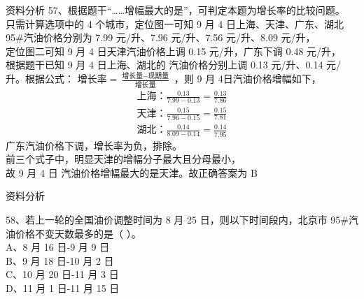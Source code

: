 \documentclass[aspectratio=169]{beamer}
\begin{document}
\begin{frame}[t]{资料分析}
    57、根据题干“……增幅最大的是”，可判定本题为增长率的比较问题。\\
    只需计算选项中的 4 个城市，定位图一可知 9 月 4 日上海、天津、广东、湖北 95\#汽油价格分别为 7.99 元/升、7.96 元/升、7.56 元/升、8.09
    元/升，\\
    定位图二可知 9 月 4 日天津汽油价格上调 0.15 元/升，广东下调 0.48 元/升，\\
    根据题干已知 9 月 4 日上海、湖北的 汽油价格分别上调 0.13 元/升、0.14 元/升。根据公式：
    $\text{增长率} = \frac{\text{增长量} - \text{现期量}}{\text{增长量}}$
    ，则 9 月 4日汽油价格增幅如下，
    \begin{gather}
        \text{上海：} \frac{0.13}{7.99-0.13} = \frac{0.13}{7.86}\\
        \text{天津：}\frac{0.15}{7.96-0.15} = \frac{0.15}{7.81}\\
        \text{湖北：}\frac{0.14}{8.09-0.14} = \frac{0.14}{7.95}
    \end{gather}
    广东汽油价格下调，增长率为负，排除。\\
    前三个式子中，明显天津的增幅分子最大且分母最小，\\
    故 9 月 4 日 汽油价格增幅最大的是天津。故正确答案为 B\\
\end{frame}                           


\begin{frame}[t]{资料分析}

    58、若上一轮的全国油价调整时间为 8 月 25 日，则以下时间段内，北京市 95\#汽油价格不变天数最多的是（ ）。          \\
    A、8 月 16 日-9 月 9 日                                                                                         \\
    B、9 月 18 日-10 月 2 日                                                                                        \\
    C、10 月 20 日-11 月 3 日                                                                                       \\
    D、11 月 1 日-11 月 15 日                                                                                       \\

\end{frame}                           
\end{document}
